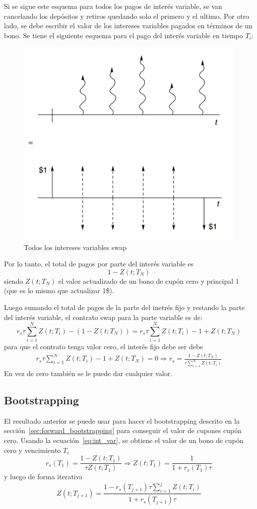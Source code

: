 Si se sigue este esquema para todos los pagos de interés variable, se van cancelando los depósitos y retiros quedando solo el primero y el ultimo.
Por otro lado, se debe escribir el valor de los intereses variables pagados en términos de un bono. Se tiene el siguiente esquema para el pago del interés variable en tiempo $T_i$:
 \begin{figure}[H]
    \centering
    \includegraphics[width=0.65\linewidth]{Imagenes/12_swaps/Interes_variable_swaps.png}
    \caption{Todos los intereses variables swap}
\end{figure}
Por lo tanto, el total de pagos por parte del interés variable es
\[
    1 - Z(t;T_N)
\]
siendo $Z(t;T_N)$ el valor actualizado de un bono de cupón cero y principal 1 (que es lo mismo que actualizar 1\$). 

Luego sumando el total de pagos de la parte del inetrés fijo y restando la parte del interés variable, el contrato swap para la parte variable es de:
\[
    r_s\tau \sum_{i=1}^N Z(t;T_i) - (1 - Z(t;T_N)) = \boxed{r_s\tau \sum_{i=1}^N Z(t;T_i) - 1 + Z(t;T_N)}
\]
para que el contrato tenga valor cero, el interés fijo debe ser debe
\begin{align}\label{eq:int_var}
    r_s\tau \sum_{i=1}^N Z(t;T_i) - 1 + Z(t;T_N) = 0 \Rightarrow \boxed{r_s = \frac{1 - Z(t;T_N)}{\tau \sum_{i=1}^N Z(t;T_i)}}
\end{align}
En vez de cero también se le puede dar cualquier valor.




\subsection{Bootstrapping}
El resultado anterior se puede usar para hacer el bootstrapping descrito en la sección~\ref{sec:forward_bootstrapping} para conseguir el valor de cupones cupón cero. Usando la ecuación~\eqref{eq:int_var}, se obtiene el valor de un bono de cupón cero y vencimiento $T_i$
\[
    r_s(T_1) = \frac{1 - Z(t;T_1)}{\tau Z(t;T_1)} \Rightarrow \boxed{Z(t;T_1) = \frac{1}{1+r_s(T_1)\tau}}
\]
y luego de forma iterativa
\[
    \boxed{Z(t; T_{j+1}) = \frac{1 - r_s(T_{j+1})\tau \sum_{i=1}^{j} Z(t; T_i)}{1 + r_s(T_{j+1})\tau}}
\]







